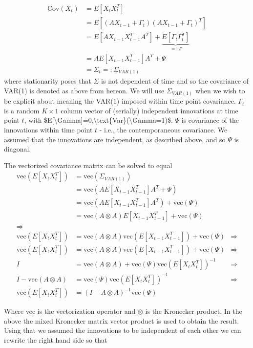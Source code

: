 \documentclass[
  letterpaper,
  DIV=11,
  numbers=noendperiod]{scrartcl}
\begin{document}
\[
\begin{align*}
\text{Cov}(X_t) &= E[X_tX_t^T] \\
&= E[(AX_{t-1}+\Gamma_t)(AX_{t-1}+\Gamma_t)^T] \\
&= E[AX_{t-1}X_{t-1}^TA^T] + \underbrace{E[\Gamma_t \Gamma_t^T]}_{=: \Psi} \\
&= AE[X_{t-1}X_{t-1}^T]A^T + \Psi \\
&= \Sigma_t=:\Sigma_{VAR(1)}
\end{align*}
\] where stationarity poses that \(\Sigma\) is not dependent of time and
so the covariance of VAR(1) is denoted as above from hereon. We will use
\(\Sigma_{VAR(1)}\) when we wish to be explicit about meaning the VAR(1)
imposed within time point covariance. \(\Gamma_t\) is a random
\(K\times1\) column vector of (serially) independent innovations at time
point \(t\), with
\$E{[}\textbackslash Gamma{]}=0,\textbackslash text\{Var\}(\textbackslash Gamma=1)\$.
\(\Psi\) is covariance of the innovations within time point \(t\) -
i.e., the contemporaneous covariance. We assumed that the innovations
are independent, as described above, and so \(\Psi\) is diagonal.

The vectorized covariance matrix can be solved to equal\\
\[
\begin{align*}
\text{vec}(E[X_tX_t^T])&=\text{vec}(\Sigma_{VAR(1)}) \\
&=\text{vec}(AE[X_{t-1}X_{t-1}^T]A^T + \Psi) \\
&=\text{vec}(AE[X_{t-1}X_{t-1}^T]A^T) + \text{vec}(\Psi) \\
&=\text{vec}(A\otimes A)E[X_{t-1}X_{t-1}^T]+\text{vec}(\Psi) \\
\Longrightarrow\\
\text{vec}(E[X_tX_t^T])&=\text{vec}(A\otimes A)\text{vec}(E[X_{t-1}X_{t-1}^T])+\text{vec}(\Psi)&\Rightarrow\\
\text{vec}(E[X_tX_t^T])&=\text{vec}(A\otimes A)\text{vec}(E[X_{t-1}X_{t-1}^T])+\text{vec}(\Psi)&\Rightarrow\\
I&=\text{vec}(A\otimes A)+\text{vec}(\Psi)\text{vec}(E[X_tX_t^T])^{-1}&\Rightarrow\\
I-\text{vec}(A\otimes A) &= \text{vec}(\Psi)\text{vec}(E[X_tX_t^T])^{-1}&\Rightarrow\\
\text{vec}(E[X_tX_t^T])&= (I-A \otimes A)^{-1} \text{vec}(\Psi)
\end{align*}
\]

Where vec is the vectorization operator and \(\otimes\) is the Kronecker
product. In the above the mixed Kronecker matrix vector product is used
to obtain the result. Using that we assumed the innovations to be
independent of each other we can rewrite the right hand side so that
\end{document}
